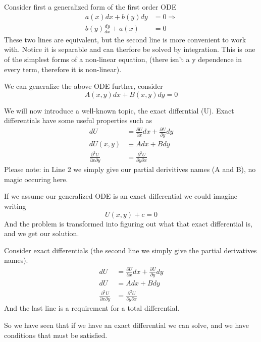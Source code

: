 \documentclass{article}
\newcommand{\be}{\begin{equation}}
\newcommand{\ee}{\end{equation}}
\newcommand{\pd}{\partial}
\begin{document}
Consider first a generalized form of the first order ODE
\be
\begin{split}
    a(x) dx + b(y) dy &= 0 \Rightarrow\\
    b(y) \frac{dy}{dx} + a(x) &= 0
\end{split}
\ee
These two lines are equivalent, but the second line is more convenient to work with.
Notice it is separable and can therfore be solved by integration.
This is one of the simplest forms of a non-linear equation, (there isn't a y dependence in every term, therefore it is non-linear). 

We can generalize the above ODE further, consider
\be
A(x,y)dx + B(x,y)dy = 0
\ee

We will now introduce a well-known topic, the exact differntial (U). 
Exact differentials have some useful properties such as
\be
\begin{split}
    dU &= \frac{\pd U}{\pd x} dx + \frac{\pd U}{\pd y} dy \\
    dU(x,y) &\equiv A dx + B dy \\
    \frac{\pd ^2 U}{\pd x \pd y} &= \frac{\pd ^2 U}{\pd y \pd x}
\end{split}
\ee
Please note: in Line 2 we simply give our partial derivitives names (A and B), no magic occuring here. 

If we assume our generalized ODE is an exact differential we could imagine writing
\be
U(x,y) + c = 0
\ee
And the problem is transformed into figuring out what that exact differential is, and we get our solution.

Consider exact differentials (the second line we simply give the partial derivatives names).
\be
\begin{split}
    dU &= \frac{\pd U}{\pd x} dx + \frac{\pd U}{\pd y} dy \\
    dU &= A dx + B dy \\
    \frac{\pd ^2 U}{\pd x \pd y} &= \frac{\pd ^2 U}{\pd y \pd x}
\end{split}
\ee
And the last line is a requirement for a total differential.

So we have seen that if we have an exact differential we can solve, and we have conditions that must be satisfied.
\end{document}
